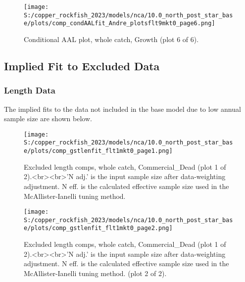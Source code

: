 \documentclass[11pt,
  letterpaper,
]{article}
\begin{document}
\begin{figure}
{\centering
\texttt{[image: S:/copper\_rockfish\_2023/models/nca/10.0\_north\_post\_star\_base/plots/comp\_condAALfit\_Andre\_plotsflt9mkt0\_page6.png]}
}
\caption{Conditional AAL plot, whole catch, Growth (plot 6 of 6).\label{fig:comp-condAALfit-Andre-plotsflt9mkt0-page6}}
\end{figure}

\subsection{Implied Fit to Excluded Data}\label{excluded-data}

\subsubsection{Length Data}\label{length-data-1}

The implied fits to the data not included in the base model due to low annual sample size are shown below.

\begin{figure}
{\centering
\texttt{[image: S:/copper\_rockfish\_2023/models/nca/10.0\_north\_post\_star\_base/plots/comp\_gstlenfit\_flt1mkt0\_page1.png]}
}
\caption{Excluded length comps, whole catch, Commercial_Dead (plot 1 of 2).<br><br>'N adj.' is the input sample size after data-weighting adjustment. N eff. is the calculated effective sample size used in the McAllister-Ianelli tuning method.\label{fig:comp_gstlenfit_flt1mkt0_page1}}
\end{figure}

\begin{figure}
{\centering
\texttt{[image: S:/copper\_rockfish\_2023/models/nca/10.0\_north\_post\_star\_base/plots/comp\_gstlenfit\_flt1mkt0\_page2.png]}
}
\caption{Excluded length comps, whole catch, Commercial_Dead (plot 1 of 2).<br><br>'N adj.' is the input sample size after data-weighting adjustment. N eff. is the calculated effective sample size used in the McAllister-Ianelli tuning method. (plot 2 of 2).\label{fig:comp_gstlenfit_flt1mkt0_page2}}
\end{figure}
\end{document}
